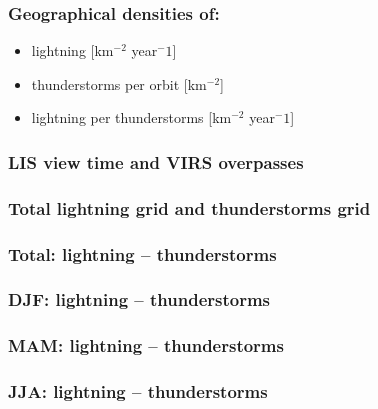 \documentclass[smaller]{beamer}
\begin{document}
\begin{frame}
\frametitle{}

\end{frame}



\begin{frame}
\frametitle{Geographical densities of:}
\Large
\begin{itemize}
\item lightning [km$^{-2}$ year${^-1}$]
\item thunderstorms per orbit [km$^{-2}$]
\item lightning per thunderstorms [km$^{-2}$ year${^-1}$]
\end{itemize}

\end{frame}

\begin{frame}
\frametitle{LIS view time and VIRS overpasses}

\end{frame}

\begin{frame}
\frametitle{Total lightning grid and thunderstorms grid}

\end{frame}




\begin{frame}
\frametitle{Total: lightning -- thunderstorms}

\end{frame}


\begin{frame}
\frametitle{DJF: lightning -- thunderstorms}

\end{frame}

\begin{frame}
\frametitle{MAM: lightning -- thunderstorms}

\end{frame}

\begin{frame}
\frametitle{JJA: lightning -- thunderstorms}

\end{frame}
\end{document}
